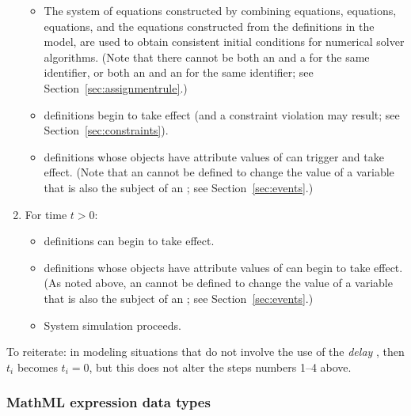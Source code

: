 \begin{enumerate}
\begin{itemize}
  \item The system of equations constructed by combining
    \AssignmentRule equations, \AlgebraicRule equations, \RateRule
    equations, and the equations constructed from the \Reaction
    definitions in the model, are used to obtain consistent
    initial conditions for numerical solver algorithms.  (Note
    that there cannot be both an \AssignmentRule and a \RateRule
    for the same identifier, or both an \AssignmentRule and an
    \InitialAssignment for the same identifier; see
    Section~\ref{sec:assignmentrule}.)
    
  \item \Constraint definitions begin to take effect (and a
    constraint violation may result; see
    Section~\ref{sec:constraints}).

  \item \Event definitions whose \Trigger objects have
     attribute values of  can
    trigger and take effect.  (Note that an \Event cannot be
    defined to change the value of a variable that is also the
    subject of an \AssignmentRule; see Section~\ref{sec:events}.)

  \end{itemize}
  
\item For time $t > 0$:
  \begin{itemize}
    
  \item \RateRule definitions can begin to take effect.
    
  \item \Event definitions whose \Trigger objects have
       attribute values of  can
    begin to take effect.  (As noted above, an \Event
    cannot be defined to change the value of a variable that is
    also the subject of an \AssignmentRule; see
    Section~\ref{sec:events}.)

  \item System simulation proceeds.

  \end{itemize}

\end{enumerate}  

To reiterate: in modeling situations that do not involve the use
of the \emph{delay} , then $t_i$ becomes $t_i = 0$,
but this does not alter the steps numbers 1--4 above.


\subsubsection{MathML expression data types}
\label{sec:mathmltype}

